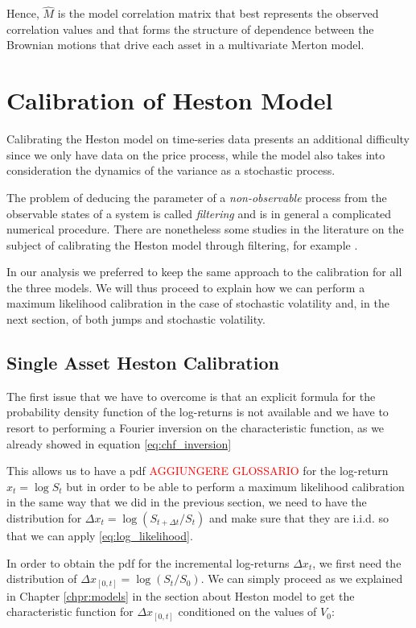 Hence, $\widehat{M}$ is the model correlation matrix that best represents the observed correlation values and that forms the structure of dependence between the Brownian motions that drive each asset in a multivariate Merton model.


\bigskip
\section{Calibration of Heston Model}
\label{sec:heston_cal}
Calibrating the Heston model on time-series data presents an additional difficulty since we only have data on the price process, while the model also takes into consideration the dynamics of the variance as a stochastic process. 

The problem of deducing the parameter of a \textit{non-observable} process from the observable states of a system is called \textit{filtering} and is in general a complicated numerical procedure. There are nonetheless some studies in the literature on the subject of calibrating the Heston model through filtering, for example \citep{filtering}.

In our analysis we preferred to keep the same approach to the calibration for all the three models. We will thus proceed to explain how we can perform a maximum likelihood calibration in the case of stochastic volatility and, in the next section, of both jumps and stochastic volatility.

\subsection{Single Asset Heston Calibration}
The first issue that we have to overcome is that an explicit formula for the probability density function of the log-returns is not available and we have to resort to performing a Fourier inversion on the characteristic function, as we already showed in equation \eqref{eq:chf_inversion}

This allows us to have a pdf \textcolor{red}{AGGIUNGERE GLOSSARIO }for the log-return $x_t = \log S_t $ but in order to be able to perform a maximum likelihood calibration in the same way that we did in the  previous section, we need to have the distribution for $\Delta x_t = \log (S_{t + \Delta t} / S_t)$ and make sure that they are i.i.d. so that we can apply \eqref{eq:log_likelihood}.

In order to obtain the pdf for the incremental log-returns $\Delta x_t$, we first need the distribution of  $\Delta x_{[0, t] }= \log (S_t / S_0)$. We can simply proceed as we explained in Chapter \ref{chpr:models} in the section about Heston model to get the characteristic function for $\Delta x_{[0, t] }$ conditioned on the values of $V_0$: 

